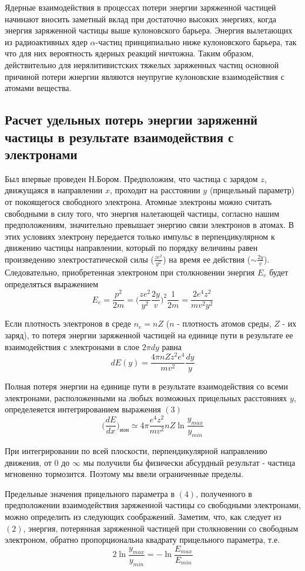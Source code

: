 \documentclass[a4paper,14pt]{extarticle}
\begin{document}
Ядерные взаимодействия в процессах потери энергии заряженной частицей начинают вносить заметный вклад при достаточно высоких энергиях, когда энергия заряженной частицы выше кулоновского барьера. Энергия вылетающих из радиоактивных ядер $\alpha$-частиц принципиально ниже кулоновского барьера, так что для них вероятность ядерных реакций ничтожна. Таким образом, действительно для нерялитивистских тяжелых заряженных частиц основной причиной потери жнергии являются неупругие кулоновские взаимодействия с атомами вещества.
\subsection{Расчет удельных потерь энергии заряженнй частицы в результате взаимодействия с электронами}

Был впервые проведен Н.Бором. Предположим, что частица с зарядом $z$, движущаяся в направлении $x$, проходит на расстоянии $y$ (прицельный параметр) от покоящегося свободного электрона. Атомные электроны можно считать свободными в силу того, что энергия налетающей частицы, согласно нашим предположениям, значительно превышает энергию связи электронов в атомах. В этих условиях электрону передается только импульс в перпендикулярном к движению частицы направлении, который по порядку величины равен произведению электростатической силы ($\frac{ze^2}{y^2}$) на время ее действия ($\sim \frac{2y}{v}$). Следовательно, приобретенная электроном при столкновении энергия $E_e$ будет определяться выражением 
$$E_e=\frac{p^2}{2m}=\Big(\frac{ze^2}{y^2}\frac{2y}{v}\Big)^2\frac{1}{2m}=\frac{2e^4z^2}{mv^2y^2} $$

Если плотность электронов в среде $n_e=nZ$ ($n$ - плотность атомов среды, $Z$ - их заряд), то потеря энергии заряженной частицей на единице пути в результате ее взаимодействия с электронами в слое $2\pi dy$ равна
$$dE(y)=\frac{4\pi n Zz^2e^4}{mv^2}\frac{dy}{y} $$

Полная потеря энергии на единице пути в результате взаимодействия со всеми электронами, расположенными на любых возможных прицельных расстояниях $y$, определеяется интегрированием выражения $(3)$
$$\Big(\frac{dE}{dx}\Big)_{ион}\simeq 4\pi \frac{e^4z^2}{mv^2}nZ\ln{\frac{y_{max}}{y_{min}}} $$

При интегрировании по всей плоскости, перпендикулярной направлению движения, от 0 до  $\infty$ мы получили бы физически абсурдный результат - частица мгновенно тормозится. Поэтому мы ввели ограниченные пределы.

Предельные значения прицельного параметра в $(4)$, полученного в предположении взаимодействия заряженной частицы со свободными электронами, можно определить из следующих соображений. Заметим, что, как следует из $(2)$, энергия, потерянная заряженной частицей при столкновении со свободным электроном, обратно пропорциональна квадрату прицельного параметра, т.е.
$$2\ln{\frac{y_{max}}{y_{min}}}=-\ln{\frac{E_{max}}{E_{min}}} $$
\end{document}
